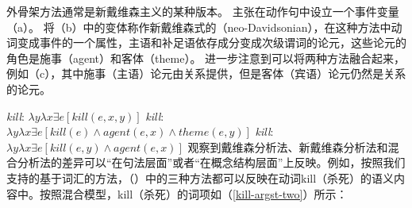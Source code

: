 外骨架方法通常是新戴维森主义的某种版本。 \citet{Davidson67a-u}主张在动作句中设立一个事件变量（a）。 \citet{Dowty89b-u}将（b）中的变体称作新戴维森式的（neo-Davidsonian），在这种方法中动词变成事件的一个属性，主语和补足语依存成分变成次级谓词的论元，这些论元的角色是施事（agent）和客体（theme）。  \citet{Kratzer96a}进一步注意到可以将两种方法融合起来，例如（c），其中施事（主语）论元由关系提供，但是客体（宾语）论元仍然是关系的论元。 

\eal\settowidth{} \label{neokill1}
\ex \emph{kill}: $\lambda y\lambda x\exists e[kill(e, x, y)]$  
\ex \emph{kill}: $\lambda y\lambda x\exists e[kill(e) \wedge agent(e, x) \wedge theme(e, y)]$ 
\ex \emph{kill}: $\lambda y\lambda x\exists e[kill(e,y) \wedge agent(e, x)]$ 
\zl
 \citet{Kratzer96a}观察到戴维森分析法、新戴维森分析法和混合分析法的差异可以“在句法层面”或者“在概念结构层面”上反映\citep[--111]{Kratzer96a}。例如，按照我们支持的基于词汇的方法，（）中的三种方法都可以反映在动词kill（杀死）的语义内容中。按照混合模型，kill（杀死）的词项如（\ref{kill-argst-two}）所示：

